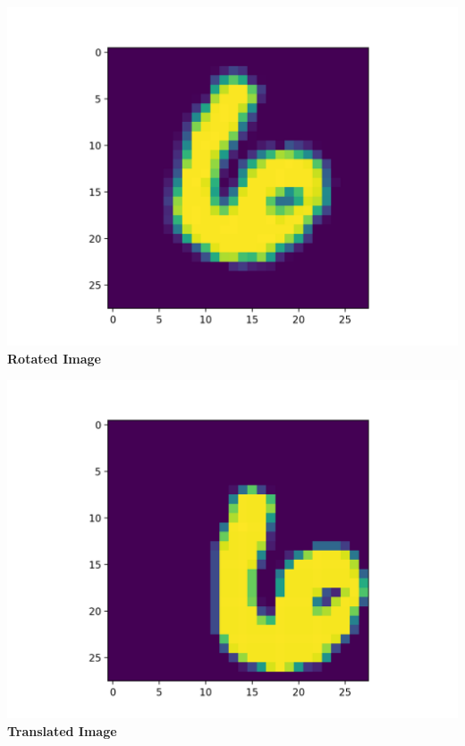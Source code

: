 \documentclass[12pt, letterpaper, notitlepage, twoside]{article}
\theoremstyle{definition}
\theoremstyle{plain}
\begin{document}
\begin{center}
    \includegraphics{Imgs/6_rot.png}
    \textbf{Rotated Image}

    \includegraphics{Imgs/6_trans.png}
    \textbf{Translated Image}
\end{center}
\end{document}
